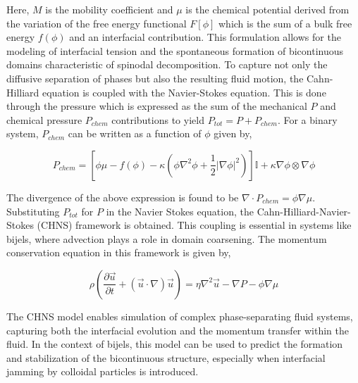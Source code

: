 Here, $M$ is the mobility coefficient and $\mu$ is the chemical potential derived from the variation of the free energy functional $F[\phi]$ which is the sum of a bulk free energy
$f(\phi)$ and an interfacial contribution. This formulation allows for the modeling of interfacial tension and the spontaneous formation of bicontinuous domains characteristic of spinodal decomposition.
To capture not only the diffusive separation of phases but also the resulting fluid motion, the Cahn-Hilliard equation is coupled with the Navier-Stokes equation. This is done
through the pressure which is expressed as the sum of the mechanical $P$ and chemical pressure $P_{chem}$ contributions to yield $P_{tot} = P + P_{chem}$. For a binary system, $P_{chem}$ 
can be written as a function of $\phi$ given by,

\begin{equation}
    P_{chem} = \left[ \phi \mu - f(\phi) - \kappa(\phi \nabla^2 \phi + \frac{1}{2}|\nabla \phi |^2 )\right] \mathbb{I} + \kappa \nabla \phi \otimes \nabla \phi
\end{equation}

The divergence of the above expression is found to be $\nabla \cdot P_{chem} = \phi \nabla \mu$. Substituting $P_{tot}$ for $P$ in the Navier Stokes equation,
the Cahn-Hilliard-Navier-Stokes (CHNS) framework is obtained. This coupling is essential in systems like bijels, where advection plays a role in domain 
coarsening. The momentum conservation equation in this framework is given by,

\begin{equation}
    \rho \left(\frac{\partial\vec{u}}{\partial t} + (\vec{u}\cdot\nabla)\vec{u} \right) = \eta \nabla^2 \vec{u} - \nabla P - \phi \nabla \mu
\end{equation}


The CHNS model enables simulation of complex phase-separating fluid systems, capturing both the interfacial evolution and the momentum transfer within the fluid. In the context of bijels, this 
model can be used to predict the formation and stabilization of the bicontinuous structure, especially when interfacial jamming by colloidal particles is introduced.

